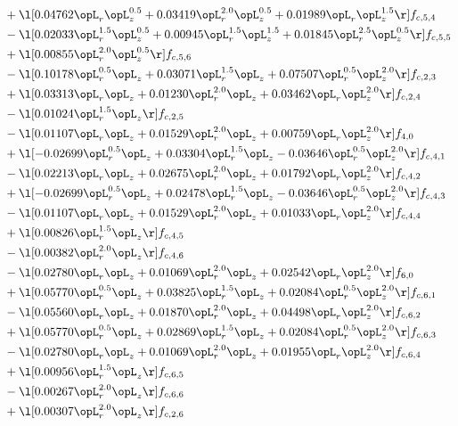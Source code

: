 \begin{alignat}{2}
& + \l[  0.04762 \opL_r \opL_z^{0.5} +  0.03419 \opL_r^{2.0} \opL_z^{0.5} +  0.01989 \opL_r \opL_z^{1.5}  \r] f_{c,5,4} \nonumber \\ 
& - \l[  0.02033 \opL_r^{1.5} \opL_z^{0.5} +  0.00945 \opL_r^{1.5} \opL_z^{1.5} +  0.01845 \opL_r^{2.5} \opL_z^{0.5}  \r] f_{c,5,5} \nonumber \\ 
& + \l[  0.00855 \opL_r^{2.0} \opL_z^{0.5}  \r] f_{c,5,6} \nonumber \\ 
& - \l[  0.10178 \opL_r^{0.5} \opL_z +  0.03071 \opL_r^{1.5} \opL_z +  0.07507 \opL_r^{0.5} \opL_z^{2.0}  \r] f_{c,2,3} \nonumber \\ 
& + \l[  0.03313 \opL_r \opL_z +  0.01230 \opL_r^{2.0} \opL_z +  0.03462 \opL_r \opL_z^{2.0}  \r] f_{c,2,4} \nonumber \\ 
& - \l[  0.01024 \opL_r^{1.5} \opL_z  \r] f_{c,2,5} \nonumber \\ 
& - \l[  0.01107 \opL_r \opL_z +  0.01529 \opL_r^{2.0} \opL_z +  0.00759 \opL_r \opL_z^{2.0}  \r] f_{4,0} \nonumber \\ 
& + \l[  -0.02699 \opL_r^{0.5} \opL_z +  0.03304 \opL_r^{1.5} \opL_z   -0.03646 \opL_r^{0.5} \opL_z^{2.0}  \r] f_{c,4,1} \nonumber \\ 
& - \l[  0.02213 \opL_r \opL_z +  0.02675 \opL_r^{2.0} \opL_z +  0.01792 \opL_r \opL_z^{2.0}  \r] f_{c,4,2} \nonumber \\ 
& + \l[  -0.02699 \opL_r^{0.5} \opL_z +  0.02478 \opL_r^{1.5} \opL_z   -0.03646 \opL_r^{0.5} \opL_z^{2.0}  \r] f_{c,4,3} \nonumber \\ 
& - \l[  0.01107 \opL_r \opL_z +  0.01529 \opL_r^{2.0} \opL_z +  0.01033 \opL_r \opL_z^{2.0}  \r] f_{c,4,4} \nonumber \\ 
& + \l[  0.00826 \opL_r^{1.5} \opL_z  \r] f_{c,4,5} \nonumber \\ 
& - \l[  0.00382 \opL_r^{2.0} \opL_z  \r] f_{c,4,6} \nonumber \\ 
& - \l[  0.02780 \opL_r \opL_z +  0.01069 \opL_r^{2.0} \opL_z +  0.02542 \opL_r \opL_z^{2.0}  \r] f_{6,0} \nonumber \\ 
& + \l[  0.05770 \opL_r^{0.5} \opL_z +  0.03825 \opL_r^{1.5} \opL_z +  0.02084 \opL_r^{0.5} \opL_z^{2.0}  \r] f_{c,6,1} \nonumber \\ 
& - \l[  0.05560 \opL_r \opL_z +  0.01870 \opL_r^{2.0} \opL_z +  0.04498 \opL_r \opL_z^{2.0}  \r] f_{c,6,2} \nonumber \\ 
& + \l[  0.05770 \opL_r^{0.5} \opL_z +  0.02869 \opL_r^{1.5} \opL_z +  0.02084 \opL_r^{0.5} \opL_z^{2.0}  \r] f_{c,6,3} \nonumber \\ 
& - \l[  0.02780 \opL_r \opL_z +  0.01069 \opL_r^{2.0} \opL_z +  0.01955 \opL_r \opL_z^{2.0}  \r] f_{c,6,4} \nonumber \\ 
& + \l[  0.00956 \opL_r^{1.5} \opL_z  \r] f_{c,6,5} \nonumber \\ 
& - \l[  0.00267 \opL_r^{2.0} \opL_z  \r] f_{c,6,6} \nonumber \\ 
& + \l[  0.00307 \opL_r^{2.0} \opL_z  \r] f_{c,2,6} \nonumber \\ 
\end{alignat} 


